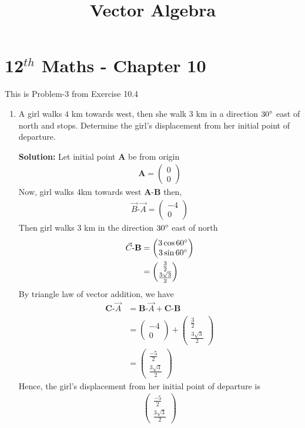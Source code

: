 \documentclass[12pt]{article}
\newcommand{\solution}{\noindent \textbf{Solution: }}
\newcommand{\myvec}[1]{\ensuremath{\begin{pmatrix}#1\end{pmatrix}}}
\let\vec\mathbf
\begin{document}
\begin{center}
\enlargethispage{-4cm}
\title{\textbf{Vector Algebra}}
\date{\vspace{-5ex}} %
\maketitle
\end{center}
\setcounter{page}{1}
\section*{12$^{th}$ Maths - Chapter 10}
This is Problem-3 from Exercise 10.4
\begin{enumerate}
\item A girl walks $4$ km towards west, then she walk $3$ km in a direction $30\degree$ east of north and stops. Determine the girl's displacement from her initial point of departure.

\solution 
		Let initial point $\vec{A}$ be from origin 
\begin{align}
	\vec{A}=\myvec{0\\0}
	\end{align}
Now, girl walks $4$km towards west $\vec{A}$-$\vec{B}$ then,
		\begin{align}
			\Vec{B}\text{-}\Vec{A}=\myvec{-4\\0}
\end{align}
Then girl walks 3 km in the direction $30\degree$ east of north
 \begin{align}
	 \Vec{C}\text{-}\vec{B}&=\myvec{3\cos{60\degree}\\3\sin{60\degree}}\\
&=\myvec{\frac{3}{2}\\ \frac{3\sqrt{3}}{2}}
 \end{align}
 By triangle law of vector addition, we have
\begin{align}
	\vec{C}\text{-}\Vec{A} &= \vec{B}\text{-}\Vec{A}+\vec{C}\text{-}\vec{B}\\
 &=\myvec{-4\\0}+\myvec{\frac{3}{2}\\[2pt] \frac{3\sqrt{3}}{2}}\\
 &=\myvec{\frac{-5}{2}\\[2pt] \frac{3\sqrt{3}}{2}}
\end{align}
  Hence, the girl's displacement from her initial point of departure is 
\begin{align}
\myvec{\frac{-5}{2}\\[2pt] \frac{3\sqrt{3}}{2}}
\end{align}


\end{enumerate}
\end{document}
